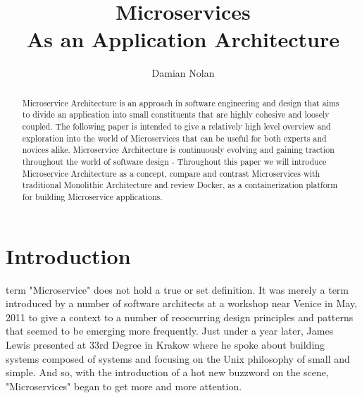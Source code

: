 \documentclass[journal]{IEEEtran}
\begin{document}
\title{Microservices \\ As an Application Architecture}


\author{ Damian Nolan }

\maketitle

\begin{abstract}
Microservice Architecture is an approach in software engineering and design that aims to divide an application into small constituents that are highly cohesive and loosely coupled. The following paper is intended to give a relatively high level overview and exploration into the world of Microservices that can be useful for both experts and novices alike. Microservice Architecture is continuously evolving and gaining traction throughout the world of software design - Throughout this paper we will introduce Microservice Architecture as a concept, compare and contrast Microservices with traditional Monolithic Architecture and review Docker, as a containerization platform for building Microservice applications.
\end{abstract}

\section{Introduction}
% 
% 
% 
% 
 term "Microservice" does not hold a true or set definition. It was merely a term introduced by a number of software architects at a workshop near Venice in May, 2011 to give a context to a number of reoccurring design principles and patterns that seemed to be emerging more frequently.
	Just under a year later, James Lewis presented at 33rd Degree in Krakow where he spoke about building systems composed of systems and focusing on the Unix philosophy of small and simple. \cite{JamesLewis33rdDegree} 
And so, with the introduction of a hot new buzzword on the scene, "Microservices" began to get more and more attention. 
\end{document}

